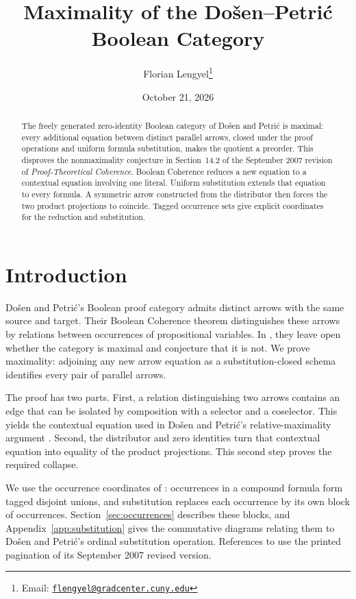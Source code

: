 \documentclass[11pt]{article}
\title{Maximality of the Do\v{s}en--Petri\'c Boolean Category}
\author{Florian Lengyel\thanks{Email: \href{mailto:flengyel@gradcenter.cuny.edu}{\texttt{flengyel@gradcenter.cuny.edu}}}}
\date{October 21, 2026}
\begin{document}
\maketitle

\begin{abstract}
The freely generated zero-identity Boolean category of Do\v{s}en and
Petri\'c is maximal: every additional equation between distinct parallel
arrows, closed under the proof operations and uniform formula
substitution, makes the quotient a preorder. This disproves the
nonmaximality conjecture in Section~14.2 of the September 2007 revision
of \emph{Proof-Theoretical Coherence}. Boolean Coherence reduces a new
equation to a contextual equation involving one literal. Uniform
substitution extends that equation to every formula. A symmetric arrow
constructed from the distributor then forces the two product
projections to coincide. Tagged occurrence sets give explicit
coordinates for the reduction and substitution.
\end{abstract}

\section{Introduction}

Do\v{s}en and Petri\'c's Boolean proof category admits distinct arrows
with the same source and target. Their Boolean Coherence theorem
distinguishes these arrows by relations between occurrences of
propositional variables. In \cite[\S14.2, p.~322]{DP}, they leave open
whether the category is maximal and conjecture that it is not. We prove
maximality: adjoining any new arrow equation as a substitution-closed
schema identifies every pair of parallel arrows.

The proof has two parts. First, a relation distinguishing two arrows
contains an edge that can be isolated by composition with a selector
and a coselector. This yields the contextual equation used in
Do\v{s}en and Petri\'c's relative-maximality argument
\cite[\S9.7, pp.~215--216]{DP}. Second, the distributor and zero
identities turn that contextual equation into equality of the product
projections. This second step proves the required collapse.

We use the occurrence coordinates of \cite[\S9]{Notation}: occurrences
in a compound formula form tagged disjoint unions, and substitution
replaces each occurrence by its own block of occurrences.
Section~\ref{sec:occurrences} describes these blocks, and
Appendix~\ref{app:substitution} gives the commutative diagrams relating
them to Do\v{s}en and Petri\'c's ordinal substitution operation.
References to \cite{DP} use the printed pagination of its September
2007 revised version.
\end{document}
